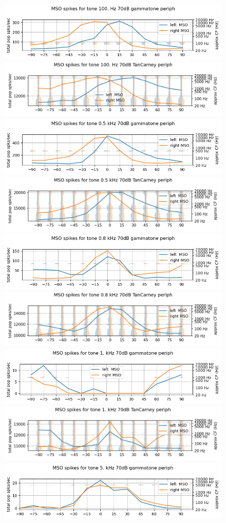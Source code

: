\documentclass[11pt,a4paper]{article}
\begin{document}
\begin{figure}[H]
    \centering
    \includegraphics[width=0.48\linewidth]{Images/gamm100.png}
    \includegraphics[width=0.48\linewidth]{Images/mtc100.png}
    \includegraphics[width=0.48\linewidth]{Images/gamm500.png}
    \includegraphics[width=0.48\linewidth]{Images/mtc500.png}
    \includegraphics[width=0.48\linewidth]{Images/gamm800.png}
    \includegraphics[width=0.48\linewidth]{Images/mtc800.png}
    \includegraphics[width=0.48\linewidth]{Images/gamm1000.png}
    \includegraphics[width=0.48\linewidth]{Images/mtc1000.png}
    \includegraphics[width=0.48\linewidth]{Images/gamm5000.png}

\end{figure}
\end{document}
